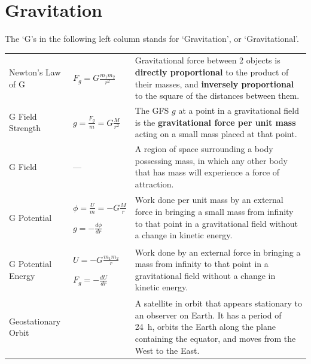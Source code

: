 \documentclass[a4paper,11pt]{article}
\begin{document}
	\section{Gravitation}
	The `G's in the following left column stands for `Gravitation', or `Gravitational'.
		\begin{center}
			\renewcommand{\arraystretch}{1.5}
			\begin{tabular}{@{} l l p{7.8cm} @{}}
				\toprule
				Newton's Law of G & $\displaystyle F_g = G\frac{m_1 m_2}{r^2}$ & Gravitational force between 2 objects is \textbf{directly proportional} to the product of their masses, and \textbf{inversely proportional} to the square of the distances between them. \\
				G Field Strength & $\displaystyle g = \frac{F_g}{m} = G\frac{M}{r^2}$ & The GFS $g$ at a point in a gravitational field is the \textbf{gravitational force per unit mass} acting on a small mass placed at that point. \\
				G Field & --- & A region of space surrounding a body possessing mass, in which any other body that has mass will experience a force of attraction.\\
				G Potential & \multicolumn{1}{p{2.8cm}}{$\displaystyle \phi = \frac{U}{m} = -G \frac{M}{r}$ \par \vspace{1.5mm} $\displaystyle g=-\frac{d\phi}{dr}$\vspace{1.5mm}} & Work done per unit mass by an external force in bringing a small mass from infinity to that point in a gravitational field without a change in kinetic energy.\\
				G Potential Energy & \multicolumn{1}{p{2.6cm}}{$\displaystyle U = -G \frac{m_1 m_2}{r}$ \par \vspace{2mm} $\displaystyle F_g=-\frac{dU}{dr}$} & Work done by an external force in bringing a mass from infinity to that point in a gravitational field without a change in kinetic energy. \\
				Geostationary Orbit & & A satellite in orbit that appears stationary to an observer on Earth. It has a period of \SI{24}{\hour}, orbits the Earth along the plane containing the equator, and moves from the West to the East.\\
				\bottomrule
			\end{tabular}
		\end{center}
\end{document}
